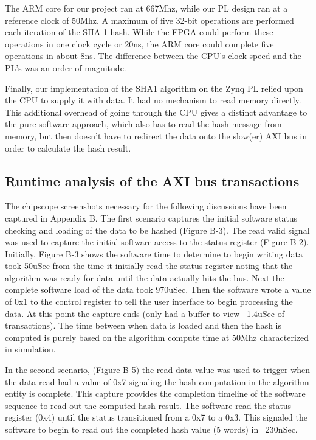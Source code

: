 \documentclass[journal]{IEEEtran}
\begin{document}
The ARM core for our project ran at 667Mhz, while our PL design ran at a reference clock of 50Mhz.  A maximum of five 32-bit operations are performed each iteration of the SHA-1 hash.  While the FPGA could perform these operations in one clock cycle or 20ns, the ARM core could complete five operations in about 8ns.  The difference between the CPU’s clock speed and the PL’s was an order of magnitude.

Finally, our implementation of the SHA1 algorithm on the Zynq PL relied upon the CPU to supply it with data.  It had no mechanism to read memory directly.  This additional overhead of going through the CPU gives a distinct advantage to the pure software approach, which also has to read the hash message from memory, but then doesn't have to redirect the data onto the slow(er) AXI bus in order to calculate the hash result.
\subsection{Runtime analysis of the AXI bus transactions}
The chipscope screenshots necessary for the following discussions have been captured in Appendix B. The first scenario captures the initial software status checking and loading of the data to be hashed  (Figure B-3).  The read valid signal was used to capture the initial software access to the status register (Figure B-2).  Initially, Figure B-3 shows the software time to determine to begin writing data took 50uSec from the time it initially read the status register noting that the algorithm was ready for data until the data actually hits the bus.  Next the complete software load of the data took 970uSec.  Then the software wrote a value of 0x1 to the control register to tell the user interface to begin processing the data.  At this point the capture ends (only had a buffer to view ~1.4uSec of transactions).  The time between when data is loaded and then the hash is computed is purely based on the algorithm compute time at 50Mhz characterized in simulation.

In the second scenario,   (Figure B-5) the read data value was used to trigger when the data read had a value of 0x7 signaling the hash computation in the algorithm entity is complete.  This capture provides the completion timeline of the software sequence to read out the computed hash result.  The software read the status register (0x4) until the status transitioned from a 0x7 to a 0x3.  This signaled the software to begin to read out the completed hash value (5 words) in ~230nSec.
\end{document}
